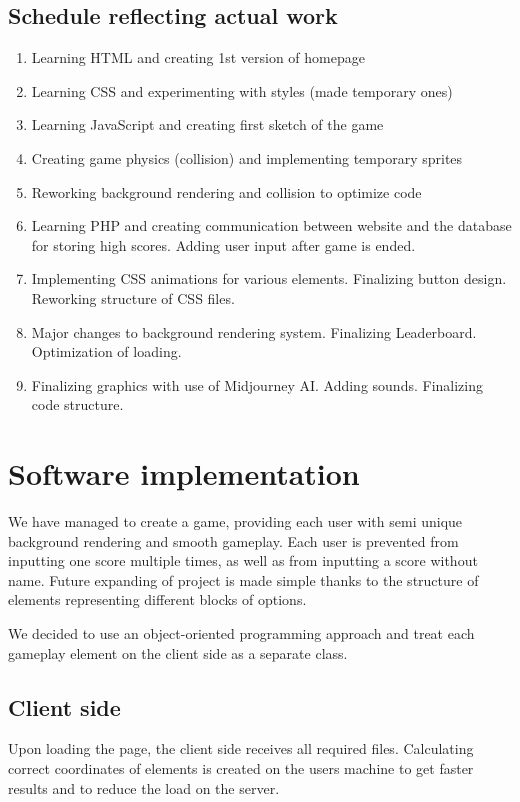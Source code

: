\documentclass[oneside,a4paper,11pt]{report}
\begin{document}
\section{Schedule reflecting actual work}
\begin{enumerate}
  \item Learning HTML and creating 1st version of homepage 
  \item Learning CSS and experimenting with styles (made temporary ones) 
  \item Learning JavaScript and creating first sketch of the game 
  \item Creating game physics (collision) and implementing temporary sprites
  \item Reworking background rendering and collision to optimize code
  \item Learning PHP and creating communication between website and the database for storing high scores. Adding user input after game is ended.
  \item Implementing CSS animations for various elements. Finalizing button design. Reworking structure of CSS files. 
  \item Major changes to background rendering system. Finalizing Leaderboard. Optimization of loading.
  \item Finalizing graphics with use of Midjourney AI. Adding sounds. Finalizing code structure.
\end{enumerate}


\chapter{Software implementation}

We have managed to create a game, providing each user with semi unique background rendering and smooth gameplay. Each user is prevented from inputting one score multiple times, as well as from inputting a score without name. Future expanding of project is made simple thanks to the structure of elements representing different blocks of options.

\par
We decided to use an object-oriented programming approach and treat each gameplay element on the client side as a separate class.


\section{Client side}

Upon loading the page, the client side receives all required files. Calculating correct coordinates of elements is created on the users machine to get faster results and to reduce the load on the server.
\end{document}
